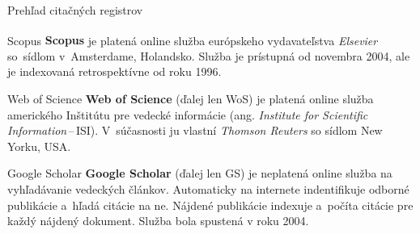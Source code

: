 \documentclass{beamer}
\newcommand{\tm}{\texttrademark}
\newcommand{\R}{\textsuperscript{\textregistered}}
\begin{document}
%
%
\begin{frame}{Prehľad citačných registrov}
  \footnotesize

  \begin{block}{Scopus}
    \textbf{Scopus\R} je platená online služba európskeho vydavateľstva
    \emph{Elsevier} so~sídlom v~Amsterdame, Holandsko. Služba je prístupná od
    novembra 2004, ale je indexovaná retrospektívne od roku 1996.

  \end{block}


  \begin{block}{Web of Science}
    \textbf{Web of Science\tm} (ďalej len WoS) je platená online služba
    amerického Inštitútu pre vedecké informácie (ang. \emph{Institute for
      Scientific Information}\,--\,ISI).  V~súčasnosti ju vlastní \emph{Thomson
      Reuters} so sídlom New Yorku, USA.
  \end{block}


  \begin{block}{Google Scholar}
    \textbf{Google Scholar} (ďalej len GS) je neplatená online služba na
    vyhľadávanie vedeckých článkov. Automaticky na internete indentifikuje
    odborné publikácie a~hľadá citácie na ne.  Nájdené publikácie indexuje
    a~počíta citácie pre každý nájdený dokument.  Služba bola spustená v roku
    2004.
  \end{block}
\end{frame}

%
%

%
%

%
%
\end{document}
